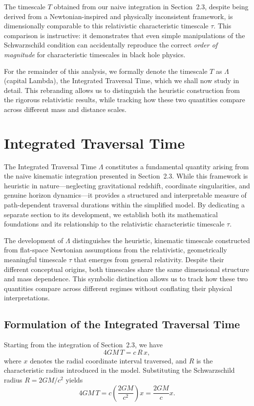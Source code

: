 \documentclass[12pt,a4paper]{article}
\begin{document}
The timescale $T$ obtained from our naive integration in Section~2.3, despite being derived from a Newtonian-inspired and physically inconsistent framework, is dimensionally comparable to this relativistic characteristic timescale $\tau$. This comparison is instructive: it demonstrates that even simple manipulations of the Schwarzschild condition can accidentally reproduce the correct \emph{order of magnitude} for characteristic timescales in black hole physics.

For the remainder of this analysis, we formally denote the timescale $T$ as $\Lambda$ (capital Lambda), the Integrated Traversal Time, which we shall now study in detail. This rebranding allows us to distinguish the heuristic construction from the rigorous relativistic results, while tracking how these two quantities compare across different mass and distance scales.

\section{Integrated Traversal Time}

The Integrated Traversal Time $\Lambda$ constitutes a fundamental quantity arising from the naive kinematic integration presented in Section~2.3. While this framework is heuristic in nature—neglecting gravitational redshift, coordinate singularities, and genuine horizon dynamics—it provides a structured and interpretable measure of path-dependent traversal durations within the simplified model. By dedicating a separate section to its development, we establish both its mathematical foundations and its relationship to the relativistic characteristic timescale $\tau$.

The development of $\Lambda$ distinguishes the heuristic, kinematic timescale constructed from flat-space Newtonian assumptions from the relativistic, geometrically meaningful timescale $\tau$ that emerges from general relativity. Despite their different conceptual origins, both timescales share the same dimensional structure and mass dependence. This symbolic distinction allows us to track how these two quantities compare across different regimes without conflating their physical interpretations.

\subsection{Formulation of the Integrated Traversal Time}

Starting from the integration of Section~2.3, we have
\begin{equation}
    4GM \, T = c \, R \, x,
\end{equation}
where $x$ denotes the radial coordinate interval traversed, and $R$ is the characteristic radius introduced in the model. Substituting the Schwarzschild radius $R = 2GM/c^2$ yields
\begin{equation}
    4GM \, T = c \left(\frac{2GM}{c^2}\right) x = \frac{2GM}{c} x.
\end{equation}
\end{document}
